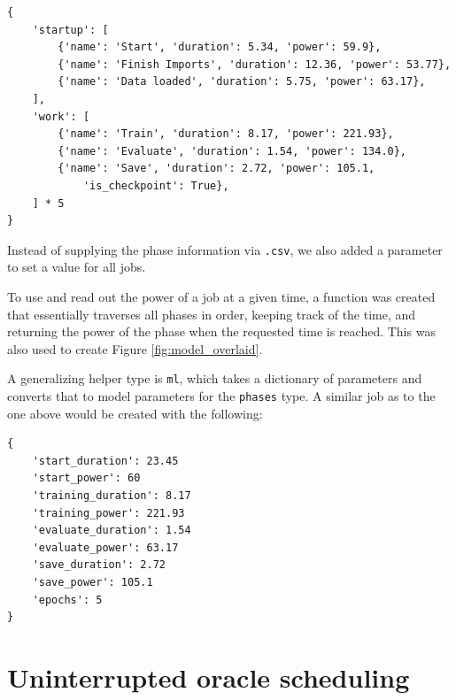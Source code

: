 \begin{minipage}{\linewidth}
\begin{lstlisting}[frame=single, numbers=none, caption={Simplified definition for a job similar to the experiment}, label={list:roberta_model_definition}, basicstyle=\ttfamily]
{
    'startup': [
        {'name': 'Start', 'duration': 5.34, 'power': 59.9},
        {'name': 'Finish Imports', 'duration': 12.36, 'power': 53.77},
        {'name': 'Data loaded', 'duration': 5.75, 'power': 63.17}, 
    ],
    'work': [
        {'name': 'Train', 'duration': 8.17, 'power': 221.93}, 
        {'name': 'Evaluate', 'duration': 1.54, 'power': 134.0}, 
        {'name': 'Save', 'duration': 2.72, 'power': 105.1,
            'is_checkpoint': True}, 
    ] * 5
}
\end{lstlisting}
\end{minipage}

Instead of supplying the phase information via \verb|.csv|, we also added a parameter to set a value for all jobs.

To use \modelname{} and read out the power of a job at a given time, a function was created that essentially traverses all phases in order, keeping track of the time, and returning the power of the phase when the requested time is reached. 
This was also used to create Figure \ref{fig:model_overlaid}.

A generalizing helper type is \verb|ml|, which takes a dictionary of parameters and converts that to model parameters for the \verb|phases| type. A similar job as to the one above would be created with the following:

\begin{minipage}{\linewidth}
\begin{lstlisting}[frame=single, numbers=none, caption={Generic model definition for machine learning jobs}, label={list:roberta_model_definition_generic}, basicstyle=\ttfamily]
{
    'start_duration': 23.45
    'start_power': 60
    'training_duration': 8.17
    'training_power': 221.93
    'evaluate_duration': 1.54
    'evaluate_power': 63.17
    'save_duration': 2.72
    'save_power': 105.1
    'epochs': 5
}
\end{lstlisting}
\end{minipage}

\section{Uninterrupted oracle scheduling} \label{sec:uninterrupted_oracle_scheduling}

